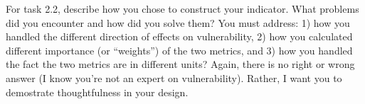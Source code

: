 \documentclass[]{article}
\begin{document}
For task 2.2, describe how you chose to construct your indicator. What
problems did you encounter and how did you solve them? You must address:
1) how you handled the different direction of effects on vulnerability,
2) how you calculated different importance (or ``weights'') of the two
metrics, and 3) how you handled the fact the two metrics are in
different units? Again, there is no right or wrong answer (I know you're
not an expert on vulnerability). Rather, I want you to demostrate
thoughtfulness in your design.
\end{document}

